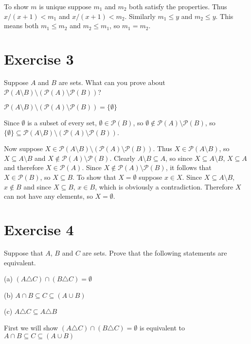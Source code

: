 \documentclass[11pt]{article}
\newcommand{\powerset}[1]{\mathscr{P}(#1)}
\begin{document}
To show $m$ is unique suppose $m_1$ and $m_2$ both satisfy the properties.
Thus $x/(x+1) < m_1$ and $x/(x+1) < m_2$. Similarly $m_1 \leq y$ and 
$m_2 \leq y$. This means both $m_1 \leq m_2$ and $m_2 \leq m_1$, so 
$m_1 = m_2$.

\section*{Exercise 3}

Suppose $A$ and $B$ are sets. What can you prove about 
$\powerset{A \setminus B} \setminus (\powerset{A} \setminus \powerset{B})$?

$\powerset{A \setminus B} \setminus (\powerset{A} \setminus \powerset{B}) = \{ \emptyset \}$

Since $\emptyset$ is a subset of every set, $\emptyset \in \powerset{B}$, so 
$\emptyset \notin \powerset{A} \setminus \powerset{B}$, so 
$\{ \emptyset \} \subseteq \powerset{A \setminus B} \setminus (\powerset{A} \setminus \powerset{B})$.

Now suppose $X \in \powerset{A \setminus B} \setminus (\powerset{A} \setminus \powerset{B})$.
Thus $X \in \powerset{A \setminus B}$, so $X \subseteq A \setminus B$ and 
$X \notin \powerset{A} \setminus \powerset{B}$. Clearly 
$A \setminus B \subseteq A$, so since $X \subseteq A \setminus B$, 
$X \subseteq A$ and therefore $X \in \powerset{A}$. Since 
$X \notin \powerset{A} \setminus \powerset{B}$, it follows that 
$X \in \powerset{B}$, so $X \subseteq B$. To show that $X = \emptyset$
suppose $x \in X$. Since $X \subseteq A \setminus B$, $x \notin B$ and since 
$X \subseteq B$, $x \in B$, which is obviously a contradiction. Therefore $X$ 
can not have any elements, so $X = \emptyset$.

\section*{Exercise 4}

Suppose that $A$, $B$ and $C$ are sets. Prove that the following statements are 
equivalent.

\noindent (a) $(A \triangle C) \cap (B \triangle C) = \emptyset$

\noindent (b) $A \cap B \subseteq C \subseteq (A \cup B)$

\noindent (c) $A \triangle C \subseteq A \triangle B$

First we will show $(A \triangle C) \cap (B \triangle C) = \emptyset$ is 
equivalent to $A \cap B \subseteq C \subseteq (A \cup B)$
\end{document}
